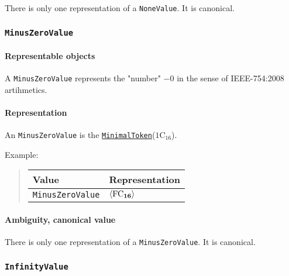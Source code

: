 \documentclass[headings=normal, headsepline, numbers=noenddot, fleqn, a4paper]{scrartcl}
\newcommand{\HexNumber}[1]{\mathrm{#1}_{16}}
\newcommand{\DborSyntaxIdent}[1]{\texttt{#1}}
\newcommand{\DborSyntaxIdentRef}[1]{\hyperlink{sec:def:#1}{\DborSyntaxIdent{#1}}}
\newcommand{\DborFirstByte}[2]{\mathbf{\textcolor{#1}{\HexNumber{#2}}}}
\newcommand{\DborFirstByteNumber}[1]{\DborFirstByte{black}{#1}}
\begin{document}
    There is only one representation of a \DborSyntaxIdent{NoneValue}.
    It is canonical.


    \subsubsection{\DborSyntaxIdent{MinusZeroValue}}
    \label{sec:def:MinusZeroValue}
    \hypertarget{sec:def:MinusZeroValue}{}

    \paragraph{Representable objects}

    A \DborSyntaxIdent{MinusZeroValue} represents the "number" $-0$ in the sense of IEEE-754:2008 artihmetics.

    \paragraph{Representation}

    An \DborSyntaxIdent{MinusZeroValue} is the \DborSyntaxIdentRef{MinimalToken}($\HexNumber{1C}$).

    \smallskip
    \noindent
    Example:
    \nolinebreak
    \begin{quote}    
        \begin{tabular}{ll}
            \toprule
            Value & Representation \\
            \midrule
            \DborSyntaxIdent{MinusZeroValue} 
                & $\langle \DborFirstByteNumber{FC} \rangle$ \\
            \bottomrule
        \end{tabular}
    \end{quote}

    \paragraph{Ambiguity, canonical value}

    There is only one representation of a \DborSyntaxIdent{MinusZeroValue}.
    It is canonical.


    \subsubsection{\DborSyntaxIdent{InfinityValue}}
    \label{sec:def:InfinityValue}
    \hypertarget{sec:def:InfinityValue}{}
\end{document}
